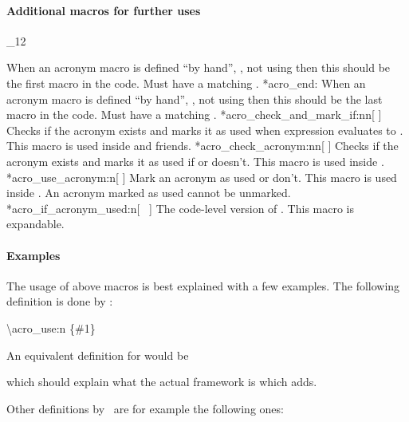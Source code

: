 \documentclass[load-preamble+,scrartcl={DIV10}]{cnltx-doc}
\makeatletter
\newcommand*\TF{\textcolor{red}{\uline{\code{\textcolor{cs}{\textit{TF}}}}}}
\renewenvironment{commands}
  {%
    \cnltx@set@catcode_{12}%
    \let\command\cnltx@command
    \cnltxlist
  }
  {\endcnltxlist}
\makeatother
\begin{document}
\paragraph{Additional macros for further uses}
\begin{commands}
  \command*{acro_begin:}
    When an acronym macro is defined \enquote{by hand}, \ie, not using
     then this should be the first macro in the code.  Must
    have a matching .
  \command*{acro_end:}
    When an acronym macro is defined \enquote{by hand}, \ie, not using
     then this should be the last macro in the code.  Must
    have a matching .
  \command*{acro_check_and_mark_if:nn}[  ]
    Checks if the acronym  exists and marks it as used when
     expression evaluates to .  This macro is used
    inside  and friends.
  \command*{acro_check_acronym:nn}[  ]
    Checks if the acronym  exists and marks it as used if 
    or doesn't.  This macro is used inside .
  \command*{acro_use_acronym:n}[ ]
    Mark an acronym as used or don't.  This macro is used inside
    .  An acronym marked as used cannot be
    unmarked.
  \expandable\command*{acro_if_acronym_used:n}[\TF\  
  ]
    The code-level version of .  This macro is expandable.
\end{commands}

\paragraph{Examples}
The usage of above macros is best explained with a few examples.  The
following definition is done by \acro:
\begin{sourcecode}
  \NewAcroCommand \ac { \acro_use:n {#1} }
\end{sourcecode}
An equivalent definition for  would be
which should explain what the actual framework is which 
adds.

Other definitions by \acro\ are for example the following ones:
\end{document}
